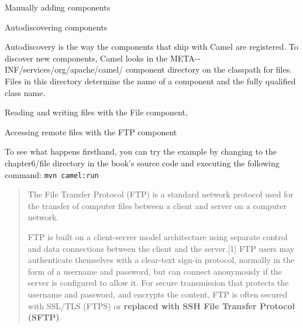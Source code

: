 \documentclass[Screen16to9,17pt]{foils}
\begin{document}




\begin{list2}
\item Manually adding components
\item Autodiscovering components
\end{list2}



Autodiscovery is the way the components that ship with Camel are registered. To discover new components, Camel looks in the META-­INF/services/org/apache/camel/
component directory on the classpath for files. Files in this directory determine the
name of a component and the fully qualified class name.




\begin{list2}
\item Reading and writing files with the File component,
\item Accessing remote files with the FTP component
\end{list2}

To see what happens firsthand, you can try the example by changing to the chapter6/file directory in the book’s source code and executing the following command:
\verb+mvn camel:run+


\begin{quote}
  The File Transfer Protocol (FTP) is a standard network protocol used for the transfer of computer files between a client and server on a computer network.

FTP is built on a client-server model architecture using separate control and data connections between the client and the server.[1] FTP users may authenticate themselves with a clear-text sign-in protocol, normally in the form of a username and password, but can connect anonymously if the server is configured to allow it. For secure transmission that protects the username and password, and encrypts the content, FTP is often secured with SSL/TLS (FTPS) or {\bf replaced with SSH File Transfer Protocol (SFTP)}.
\end{quote}
\end{document}
